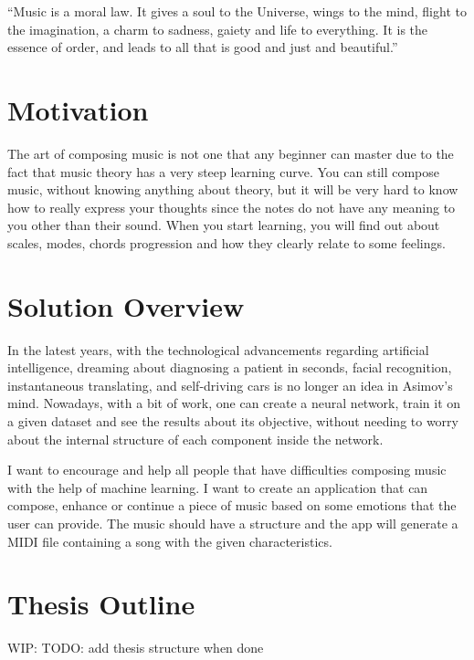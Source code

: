“Music is a moral law. It gives a soul to the Universe, wings to the mind, flight to the imagination, a charm to sadness, gaiety and life to everything.
It is the essence of order, and leads to all that is good and just and beautiful.” \cite{quotationDictionary}

\section{Motivation}

The art of composing music is not one that any beginner can master due to the fact that
music theory has a very steep learning curve.
You can still compose music, without knowing anything about theory,
but it will be very hard to know how to really express your
thoughts since the notes do not have any meaning to you other than their sound.
When you start learning, you will find out about scales,
modes, chords progression and how they clearly relate to some feelings.

\section{Solution Overview}

In the latest years, with the technological advancements regarding artificial intelligence,
dreaming about diagnosing a patient in seconds, facial recognition, instantaneous translating,
and self-driving cars is no longer an idea in Asimov’s mind.
Nowadays, with a bit of work, one can create a neural network,
train it on a given dataset and see the results about its objective,
without needing to worry about the internal structure of each component inside the network.

I want to encourage and help all people that have difficulties composing music with the help of machine learning.
I want to create an application that can compose,
enhance or continue a piece of music based on some emotions that the user can provide.
The music should have a structure and the app will generate
a MIDI file containing a song with the given characteristics.

\section{Thesis Outline}
WIP: TODO: add thesis structure when done